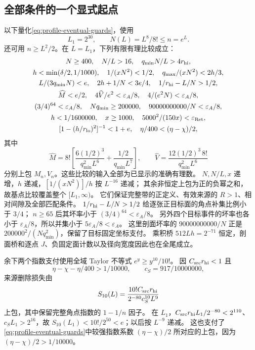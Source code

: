 \documentclass[UTF8,a4paper,11pt,fontset=fandol]{ctexart}
\theoremstyle{remark}
\begin{document}
\subsection{全部条件的一个显式起点}\label{subsec:profile-threshold}
以下量化\eqref{eq:profile-eventual-guards}，使用
\[
 L_1=2^{30},\qquad N(L)=L^8/8!\le n=e^L.
\]
还可用 $n\ge L^2/2$。在 $L=L_1$，下列有限有理比较成立：
\begin{equation}\label{eq:profile-threshold-base}
\begin{gathered}
 N\ge400,\quad N/L>16,\quad q_{\min}N/L>4r_{\rm hi},\\
 h<\min(\delta/2,1/1000),\quad1/(xN^2)<1/2,
 \quad q_{\max}/(xN^2)<2h/3,\\
 L/(3q_{\min}N)<e,\quad2h+1/N<3e/4,\quad
 1/r_{\rm hi}-L/N>1/2,\\
 \widehat M<e/2,\quad4\widehat V/e^2<\varepsilon_A/8,
 \quad4/(e^2N)<\varepsilon_A/8,\\
 (3/4)^{64}<\varepsilon_A/8,\quad Nq_{\min}\ge200000,
 \quad90000000000/N<\varepsilon_A/8,\\
 h<1/1600000,\quad x\ge1000,\quad5000^2/(150x)<\varepsilon_{\rm Ret},\\
 [1-(h/r_{\rm lo})^2]^{-1}<1+e,\quad
 \eta/400<(\eta-\chi)/2,
\end{gathered}
\end{equation}
其中
\[
 \widehat M=8!\left[\frac{6(1/2)^3}{q_{\min}^2L^6}
 +\frac{1/2}{q_{\min}L^7}\right],\qquad
 \widehat V=\frac{12(1/2)^3\,8!}{q_{\min}^2L^6}
\]
分别上包 $M_n,V_n$。这些比较的输入全部为已显示的准确有理数。
$N,N/L,x$ 递增，$h$ 递减，$[1/(xN^2)]/h$ 按 $L^{-16}$ 递减；
其余非恒定上包为正的负幂之和，故基点比较覆盖整个 $[L_1,\infty)$。
它们保证完整带的正定义、有效来源的 $R>1$、相对间隙及全部匹配条件。
$1/r_{\rm hi}-L/N>1/2$ 给逐张正目标面的角点补集比例小于 $3/4$；
$n\ge65$ 后其坏率小于 $(3/4)^{64}<\varepsilon_A/8$。
另外四个目标事件的坏率也各小于 $\varepsilon_A/8$，所以并集小于 $5\varepsilon_A/8<\varepsilon_A$。
这里剖面坏率的 $90000000000/N$ 正是 $200000^2/(Nq_{\min}^2)$，保留了目标固定坐标支付。
乘积桥 $512Lh=2^{-71}$ 恒定，剖面桥和逐点 $J$、负固定面计数以及径向宽度因此也在全尾成立。

余下两个指数支付使用全域 Taylor 不等式 $e^y\ge y^{10}/10!$。
因 $C_{\rm src}r_{\rm hi}<1$ 且
\[
 \eta-\chi-\eta/400>1/10000,\qquad c_S=917/10000000,
\]
来源删除损失由
\begin{equation}\label{eq:profile-cap-power}
 S_{10}(L)=\frac{10!C_{\rm src}r_{\rm hi}}{2^{-80}c_S^{10}L^9}
\end{equation}
上包，其中保留完整角点指数的 $1-1/n$ 因子。
在 $L_1$，$C_{\rm src}r_{\rm hi}L_1/2^{-80}<2^{110}$、$c_SL_1>2^{16}$，故
$S_{10}(L_1)<10!/2^{50}<e$；以后按 $L^{-9}$ 递减。
这也支付了\eqref{eq:profile-eventual-guards}中较强指数系数 $(\eta-\chi)/2$ 所对应的上包，因为 $(\eta-\chi)/2>1/10000$。
\end{document}
